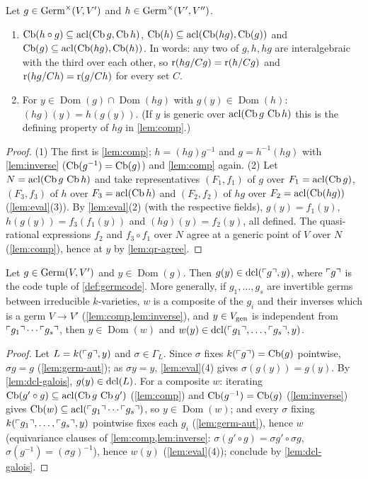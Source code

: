 \begin{lemma}\label{lem:comp-codes}
Let $g\in\operatorname{Germ}^\times(V,V')$ and $h\in\operatorname{Germ}^\times(V',V'')$.
\begin{enumerate}[nosep]
\item $\operatorname{Cb}(h\circ g)\subseteq\operatorname{acl}(\operatorname{Cb} g,\operatorname{Cb} h)$, $\operatorname{Cb}(h)\subseteq\operatorname{acl}(\operatorname{Cb}(hg),\operatorname{Cb}(g))$ and
  $\operatorname{Cb}(g)\subseteq\operatorname{acl}(\operatorname{Cb}(hg),\operatorname{Cb}(h))$.  In words: any two of $g,h,hg$ are
  interalgebraic with the third over each other, so $\operatorname{r}(hg/Cg)=\operatorname{r}(h/Cg)$ and
  $\operatorname{r}(hg/Ch)=\operatorname{r}(g/Ch)$ for every set $C$.
\item For $y\in\operatorname{Dom}(g)\cap\operatorname{Dom}(hg)$ with $g(y)\in\operatorname{Dom}(h)$:
  $(hg)(y)=h(g(y))$.  (If $y$ is generic over $\operatorname{acl}(\operatorname{Cb} g\,\operatorname{Cb} h)$ this is the defining
  property of $hg$ in \cref{lem:comp}.)
\end{enumerate}
\end{lemma}
\begin{proof}
(1) The first is \cref{lem:comp}; $h=(hg)g^{-1}$ and $g=h^{-1}(hg)$ with
\cref{lem:inverse} ($\operatorname{Cb}(g^{-1})=\operatorname{Cb}(g)$) and \cref{lem:comp} again.
(2) Let $N=\operatorname{acl}(\operatorname{Cb} g\,\operatorname{Cb} h)$ and take representatives $(F_1,f_1)$ of $g$ over
$F_1=\operatorname{acl}(\operatorname{Cb} g)$, $(F_3,f_3)$ of $h$ over $F_3=\operatorname{acl}(\operatorname{Cb} h)$ and $(F_2,f_2)$ of $hg$ over
$F_2=\operatorname{acl}(\operatorname{Cb}(hg))$ (\cref{lem:eval}(3)).  By \cref{lem:eval}(2) (with the respective
fields), $g(y)=f_1(y)$, $h(g(y))=f_3(f_1(y))$ and $(hg)(y)=f_2(y)$, all defined.  The
quasi-rational expressions $f_2$ and $f_3\circ f_1$ over $N$ agree at a generic point
of $V$ over $N$ (\cref{lem:comp}), hence at $y$ by \cref{lem:qr-agree}.
\end{proof}

\begin{lemma}\label{lem:eval-dcl}
Let $g\in\operatorname{Germ}(V,V')$ and $y\in\operatorname{Dom}(g)$.  Then $g(y)\in\operatorname{dcl}(\ulcorner g\urcorner,y)$,
where $\ulcorner g\urcorner$ is the code tuple of \cref{def:germcode}.  More generally, if
$g_1,\dots,g_s$ are invertible germs between irreducible $k$-varieties, $w$ is a
composite of the $g_i$ and their inverses which is a germ $V\to V'$
(\cref{lem:comp,lem:inverse}), and $y\in V_{\operatorname{gen}}$ is independent from
$\ulcorner g_1\urcorner\cdots\ulcorner g_s\urcorner$, then $y\in\operatorname{Dom}(w)$ and
$w(y)\in\operatorname{dcl}(\ulcorner g_1\urcorner,\dots,\ulcorner g_s\urcorner,y)$.
\end{lemma}
\begin{proof}
Let $L=k(\ulcorner g\urcorner,y)$ and $\sigma\in\Gamma_L$.  Since $\sigma$ fixes $k(\ulcorner g\urcorner)=\operatorname{Cb}(g)$
pointwise, $\sigma g=g$ (\cref{lem:germ-aut}); as $\sigma y=y$, \cref{lem:eval}(4) gives
$\sigma(g(y))=g(y)$.  By \cref{lem:dcl-galois}, $g(y)\in\operatorname{dcl}(L)$.  For a composite $w$:
iterating $\operatorname{Cb}(g'\circ g)\subseteq\operatorname{acl}(\operatorname{Cb} g\,\operatorname{Cb} g')$ (\cref{lem:comp}) and
$\operatorname{Cb}(g^{-1})=\operatorname{Cb}(g)$ (\cref{lem:inverse}) gives
$\operatorname{Cb}(w)\subseteq\operatorname{acl}(\ulcorner g_1\urcorner\cdots\ulcorner g_s\urcorner)$, so $y\in\operatorname{Dom}(w)$; and every
$\sigma$ fixing $k(\ulcorner g_1\urcorner,\dots,\ulcorner g_s\urcorner,y)$ pointwise fixes each $g_i$
(\cref{lem:germ-aut}), hence $w$ (equivariance clauses of \cref{lem:comp,lem:inverse}:
$\sigma(g'\circ g)=\sigma g'\circ\sigma g$, $\sigma(g^{-1})=(\sigma g)^{-1}$), hence
$w(y)$ (\cref{lem:eval}(4)); conclude by \cref{lem:dcl-galois}.
\end{proof}

